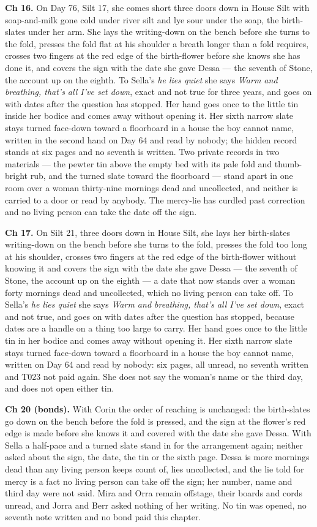 \documentclass{design/chronicle}
\begin{document}
{\textbf{Ch 16.} On Day 76, Silt 17, she comes short three doors down in House Silt with soap-and-milk gone cold under river silt and lye sour under the soap, the birth-slates under her arm. She lays the writing-down on the bench before she turns to the fold, presses the fold flat at his shoulder a breath longer than a fold requires, crosses two fingers at the red edge of the birth-flower before she knows she has done it, and covers the sign with the date she gave Dessa --- the seventh of Stone, the account up on the eighth. To Sella’s \emph{he lies quiet} she says \emph{Warm and breathing, that’s all I’ve set down}, exact and not true for three years, and goes on with dates after the question has stopped. Her hand goes once to the little tin inside her bodice and comes away without opening it. Her sixth narrow slate stays turned face-down toward a floorboard in a house the boy cannot name, written in the second hand on Day 64 and read by nobody; the hidden record stands at six pages and no seventh is written. Two private records in two materials --- the pewter tin above the empty bed with its pale fold and thumb-bright rub, and the turned slate toward the floorboard --- stand apart in one room over a woman thirty-nine mornings dead and uncollected, and neither is carried to a door or read by anybody. The mercy-lie has curdled past correction and no living person can take the date off the sign.

\textbf{Ch 17.} On Silt 21, three doors down in House Silt, she lays her birth-slates writing-down on the bench before she turns to the fold, presses the fold too long at his shoulder, crosses two fingers at the red edge of the birth-flower without knowing it and covers the sign with the date she gave Dessa — the seventh of Stone, the account up on the eighth — a date that now stands over a woman forty mornings dead and uncollected, which no living person can take off. To Sella’s \emph{he lies quiet} she says \emph{Warm and breathing, that’s all I’ve set down}, exact and not true, and goes on with dates after the question has stopped, because dates are a handle on a thing too large to carry. Her hand goes once to the little tin in her bodice and comes away without opening it. Her sixth narrow slate stays turned face-down toward a floorboard in a house the boy cannot name, written on Day 64 and read by nobody: six pages, all unread, no seventh written and T023 not paid again. She does not say the woman’s name or the third day, and does not open either tin.

\textbf{Ch 20 (bonds).} With Corin the order of reaching is unchanged: the birth-slates go down on the bench before the fold is pressed, and the sign at the flower’s red edge is made before she knows it and covered with the date she gave Dessa. With Sella a half-pace and a turned slate stand in for the arrangement again; neither asked about the sign, the date, the tin or the sixth page. Dessa is more mornings dead than any living person keeps count of, lies uncollected, and the lie told for mercy is a fact no living person can take off the sign; her number, name and third day were not said. Mira and Orra remain offstage, their boards and cords unread, and Jorra and Berr asked nothing of her writing. No tin was opened, no seventh note written and no bond paid this chapter.

}
\end{document}
